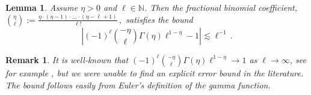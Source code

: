 \documentclass[12pt]{article} %
\newtheorem{lemma}[theorem]{Lemma}
\newtheorem{remark}{Remark}
\begin{document}
\begin{lemma} \label{lem:frac-binom-coef-convergence}  Assume $\eta>0$ and $\ell\in\mathbb N$. Then  the fractional binomial coefficient, 
%
$\binom{\eta}{\ell} := \frac{\eta \cdot (\eta - 1)\cdot \dots \cdot(\eta%
- \ell + 1)}{\ell!} \, ,$
%
satisfies the bound
%
$$ \left|(-1)^\ell \binom{-\eta}{\ell} \Gamma(\eta) \ell^{1 - \eta} - 1 \right| \lesssim \ell^{-1} \, .$$
\end{lemma}
%
\begin{remark}
It is well-known that $(-1)^\ell \binom{-\eta}{\ell} \Gamma(\eta) \ell^{1 -\eta} \rightarrow 1$  as $\ell\to \infty$, see for example \cite{Levrie2017},  but we were unable to find an explicit error bound in the literature. The bound follows easily from Euler's definition of the gamma function.
\end{remark}
\end{document}
